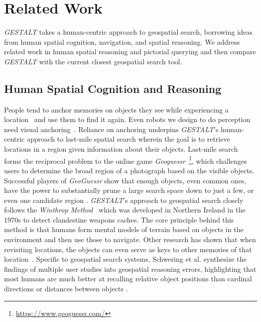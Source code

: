 \section{Related Work}
\label{section:related}
\normalsize
\emph{GESTALT} takes a human-centric approach to geospatial search, borrowing ideas from human spatial cognition, navigation, and spatial reasoning.
We address related work in human spatial reasoning and pictorial querying and then compare \emph{GESTALT} with the current closest geospatial search tool.

\subsection{Human Spatial Cognition and Reasoning}
People tend to anchor memories on objects they see while experiencing a location~\cite{Helbing2020} and use them to find it again. 
Even robots we design to do perception need visual anchoring~\cite{Oliveira2016}.
Reliance on anchoring underpins \emph{GESTALT}'s human-centric approach to last-mile spatial search wherein the goal is to retrieve locations in a region given information about their objects.
Last-mile search forms the reciprocal problem to the online game \textit{Geoguessr}~\footnote{\href{https://www.geoguessr.com/}{https://www.geoguessr.com/}}, which challenges users to determine the broad region of a photograph based on the visible objects.
Successful players of \textit{GeoGuessr} show that enough objects, even common ones, have the power to substantially prune a large search space down to just a few, or even one candidate region \cite{BernersLee2023}.
\emph{GESTALT}'s approach to geospatial search closely follows the \textit{Winthrop Method}~\cite{Keatley2021} which was developed in Northern Ireland in the 1970s to detect clandestine weapons caches.
The core principle behind this method is that humans form mental models of terrain based on objects in the environment and then use those to navigate.
Other research has shown that when revisiting locations, the objects can even serve as keys to other memories of that location~\cite{Miller2013}.
Specific to geospatial search systems, Schwering et al. synthesize the findings of multiple user studies into geospatial reasoning errors, highlighting that most humans are much better at recalling relative object positions than cardinal directions or distances between objects \cite{Schwering2014}.



